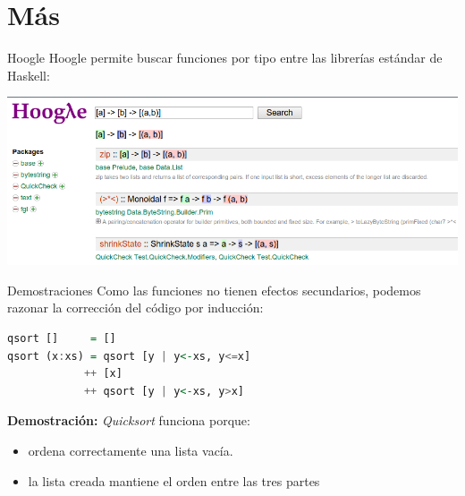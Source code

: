\section{Más}

\begin{frame}[fragile]{Hoogle}
  Hoogle permite buscar funciones por tipo entre las librerías
  estándar de Haskell:

  \begin{center}
  \includegraphics[scale=0.35]{./images/hoogle.png}
  \end{center}
\end{frame}


\begin{frame}[fragile]{Demostraciones}
  Como las funciones no tienen efectos secundarios, podemos razonar la
  corrección del código por inducción:

  \begin{lstlisting}[language=haskell]
qsort []     = []
qsort (x:xs) = qsort [y | y<-xs, y<=x]
            ++ [x]
            ++ qsort [y | y<-xs, y>x]
  \end{lstlisting}

  \textbf{Demostración:} \textit{Quicksort} funciona porque:
  \begin{itemize}
   \item ordena correctamente una lista vacía.
   \item la lista creada mantiene el orden entre las tres partes
  \end{itemize}
\end{frame}


